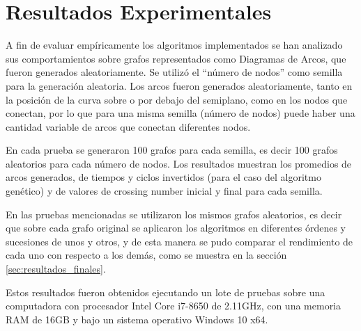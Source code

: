 \chapter{Resultados Experimentales}\label{cap5}
A fin de evaluar empíricamente los algoritmos implementados se han analizado sus comportamientos sobre grafos representados como Diagramas de Arcos, que fueron generados aleatoriamente. Se utilizó el ``número de nodos''  como semilla para la generación aleatoria. Los arcos fueron generados aleatoriamente, tanto en la posición de la curva sobre o por debajo del semiplano, como en los nodos que conectan, por lo que para una misma semilla (número de nodos) puede haber una cantidad variable de arcos que conectan diferentes nodos. 

En cada prueba se generaron 100 grafos para cada semilla, es decir 100 grafos aleatorios para cada número de nodos. Los resultados muestran los promedios de arcos generados, de tiempos y ciclos invertidos (para el caso del algoritmo genético) y de valores de crossing number inicial y final para cada semilla. 

En las pruebas mencionadas se utilizaron los mismos grafos aleatorios, es decir que sobre cada grafo original se aplicaron los algoritmos en diferentes órdenes y sucesiones de unos y otros, y de esta manera se pudo comparar el rendimiento de cada uno con respecto a los demás, como se muestra en la sección \ref{sec:resultados_finales}.

Estos resultados fueron obtenidos ejecutando un lote de pruebas sobre una computadora con procesador Intel Core i7-8650 de 2.11GHz, con una memoria RAM de 16GB y bajo un sistema operativo Windows 10 x64.

